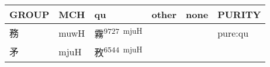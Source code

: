 \documentclass[14pt,a4paper]{scrartcl}
\begin{document}
\begin{longtable}[c]{@{}llllll@{}}
\toprule
\begin{minipage}[b]{0.14\columnwidth}\raggedright\strut
GROUP
\strut\end{minipage} &
\begin{minipage}[b]{0.14\columnwidth}\raggedright\strut
MCH
\strut\end{minipage} &
\begin{minipage}[b]{0.14\columnwidth}\raggedright\strut
qu
\strut\end{minipage} &
\begin{minipage}[b]{0.14\columnwidth}\raggedright\strut
other
\strut\end{minipage} &
\begin{minipage}[b]{0.14\columnwidth}\raggedright\strut
none
\strut\end{minipage} &
\begin{minipage}[b]{0.14\columnwidth}\raggedright\strut
PURITY
\strut\end{minipage}\tabularnewline
\midrule
\endhead
\begin{minipage}[t]{0.14\columnwidth}\raggedright\strut
務
\strut\end{minipage} &
\begin{minipage}[t]{0.14\columnwidth}\raggedright\strut
muwH
\strut\end{minipage} &
\begin{minipage}[t]{0.14\columnwidth}\raggedright\strut
霧\textsuperscript{9727~mjuH}
\strut\end{minipage} &
\begin{minipage}[t]{0.14\columnwidth}\raggedright\strut
\strut\end{minipage} &
\begin{minipage}[t]{0.14\columnwidth}\raggedright\strut
\strut\end{minipage} &
\begin{minipage}[t]{0.14\columnwidth}\raggedright\strut
pure:qu
\strut\end{minipage}\tabularnewline
\begin{minipage}[t]{0.14\columnwidth}\raggedright\strut
矛
\strut\end{minipage} &
\begin{minipage}[t]{0.14\columnwidth}\raggedright\strut
mjuH
\strut\end{minipage} &
\begin{minipage}[t]{0.14\columnwidth}\raggedright\strut
敄\textsuperscript{6544~mjuH}
\strut\end{minipage} &

\end{longtable}
\end{document}
